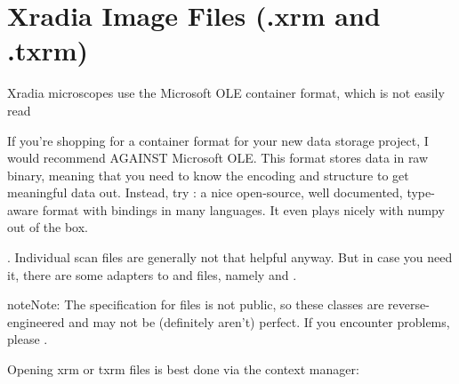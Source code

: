 \documentclass[letterpaper,10pt,english]{sphinxmanual}
\begin{document}
\section{Xradia Image Files (.xrm and .txrm)}
\label{\detokenize{importing:xradia-image-files-xrm-and-txrm}}
Xradia microscopes use the Microsoft OLE container format, which is
not easily read %
\begin{footnote}[1]\sphinxAtStartFootnote
If you’re shopping for a container format for your new data
storage project, I would recommend AGAINST Microsoft
OLE. This format stores data in raw binary, meaning that you
need to know the encoding and structure to get meaningful
data out. Instead, try : a nice open-source, well
documented, type-aware format with bindings in many
languages. It even plays nicely with numpy out of the box.
%
\end{footnote}. Individual scan files are generally not that
helpful anyway. But in case you need it, there are some adapters to
 and  files, namely
{\hyperref[\detokenize{xanespy:xanespy.xradia.XRMFile}]{}} and
{\hyperref[\detokenize{xanespy:xanespy.xradia.TXRMFile}]{}}.

\begin{sphinxadmonition}{note}{Note:}
The specification for  files is not public, so these
classes are reverse-engineered and may not be (definitely aren’t)
perfect. If you encounter problems, please .
\end{sphinxadmonition}

Opening xrm or txrm files is best done via the context manager:
\end{document}
